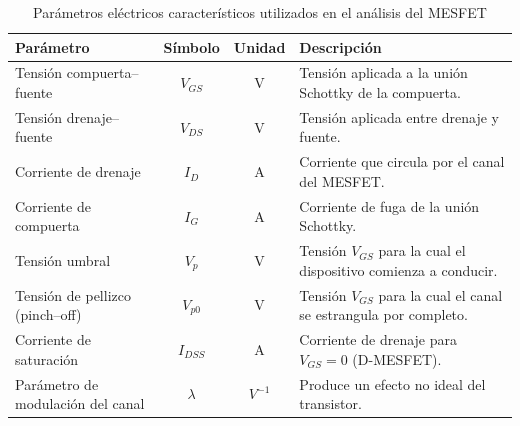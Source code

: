 \documentclass[a4paper]{article}
\begin{document}
\begin{table}[H]
	\centering
	\caption{Parámetros eléctricos característicos utilizados en el análisis del MESFET}
	\label{tab:param_elec_mesfet}
	\begin{tabular}{|l|c|c|l|}
		\hline
		\textbf{Parámetro} & \textbf{Símbolo} & \textbf{Unidad} & \textbf{Descripción} \\ \hline
		Tensión compuerta--fuente & $V_{GS}$ & V & Tensión aplicada a la unión Schottky de la compuerta.\\ \hline
		Tensión drenaje--fuente & $V_{DS}$ & V & Tensión aplicada entre drenaje y fuente. \\ \hline
		Corriente de drenaje & $I_D$ & A & Corriente que circula por el canal del MESFET. \\ \hline
		Corriente de compuerta & $I_G$ & A & Corriente de fuga de la unión Schottky.\\ \hline
		Tensión umbral & $V_p$ & V & Tensión $V_{GS}$ para la cual el dispositivo comienza a conducir. \\ \hline
		Tensión de pellizco (pinch--off) & $V_{p0}$ & V & Tensión $V_{GS}$ para la cual el canal se estrangula por completo. \\ \hline
		Corriente de saturación & $I_{DSS}$ & A & Corriente de drenaje para $V_{GS} = 0$ (D-MESFET).\\ \hline
		Parámetro de modulación del canal & $\lambda$ & $V^{-1}$& Produce un efecto no ideal del transistor.\\ \hline
	\end{tabular}
\end{table}



\end{document}
